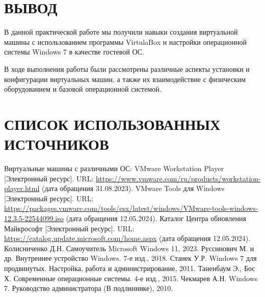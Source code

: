 \clearpage

\section*{\LARGE ВЫВОД}

В данной практической работе мы получили навыки создания виртуальной машины
с использованием программы VirtulaBox
и настройки операционной системы Windows 7 в качестве гостевой ОС.\par
В ходе выполнения работы были рассмотрены различные аспекты установки
и конфигурации виртуальных машин,
а также их взаимодействие с физическим оборудованием
и базовой операционной системой.

\clearpage

\section*{\LARGE СПИСОК ИСПОЛЬЗОВАННЫХ ИСТОЧНИКОВ}

\begin{thebibliography}{00}
	\bibitem{} Виртуальные машины с различными ОС: VMware Workstation Player
		[Электронный ресурс].
		URL: \url{https://www.vmware.com/ru/products/workstation-player.html}
		(дата обращения 31.08.2023).
	\bibitem{} VMware Tools для Windows [Электронный ресурс].
		URL: \url{https://packages.vmware.com/tools/esx/latest/windows/VMware-tools-windows-12.3.5-22544099.iso}
		(дата обращения 12.05.2024).
	\bibitem{} Каталог Центра обновления Майкрософт [Электронный ресурс].
		URL: \url{https://catalog.update.microsoft.com/home.aspx}
		(дата обращения 12.05.2024).
	\bibitem{} Колисниченко Д.Н. Самоучитель Microsoft Windows 11, 2023.
	\bibitem{} Руссинович М. и др. Внутреннее устройство Windows.
		7-е изд., 2018.
	\bibitem{} Станек У.Р. Windows 7 для продвинутых.
		Настройка, работа и администрирование, 2011.
	\bibitem{} Таненбаум Э., Бос Х. Современные операционные системы.
		4-е изд., 2015.
	\bibitem{} Чекмарев А.Н. Windows 7.
		Руководство администратора (В подлиннике), 2010.
\end{thebibliography}

